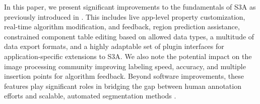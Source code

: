 In this paper, we present significant improvements to the fundamentals of S3A as previously introduced in \cite{jessurunComponentDetectionEvaluation2020}.
This includes live app-level property customization, real-time algorithm modification, and feedback, region prediction assistance, constrained component table editing based on allowed data types, a multitude of data export formats, and a highly adaptable set of plugin interfaces for application-specific extensions to S3A.
We also note the potential impact on the image processing community improving labeling speed, accuracy, and multiple insertion points for algorithm feedback.
Beyond software improvements, these features play significant roles in bridging the gap between human annotation efforts and scalable, automated segmentation methods \cite{Branson_humansInLoop}.